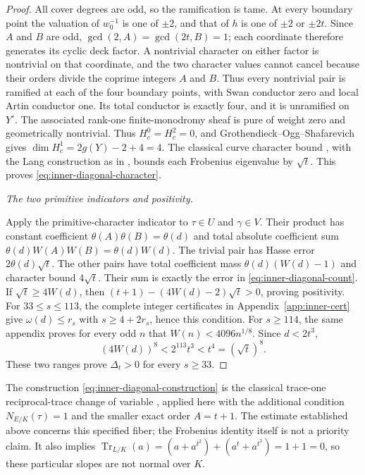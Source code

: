\documentclass[11pt]{article}
\begin{document}
\begin{proof}
All cover degrees are odd, so the ramification is tame.
At every boundary point the valuation of $w_0^{-1}$ is one of
$\pm2$, and that of $h$ is one of $\pm2$ or $\pm2t$.
Since $A$ and $B$ are odd, $\gcd(2,A)=\gcd(2t,B)=1$; each
coordinate therefore generates its cyclic deck factor. A nontrivial
character on either factor is nontrivial on that coordinate, and the
two character values cannot cancel because their orders divide the
coprime integers $A$ and $B$. Thus every nontrivial pair is ramified
at each of the four boundary points, with Swan conductor zero and
local Artin conductor one.
Its total conductor is exactly four, and it is unramified on
$Y^\circ$.
The associated rank-one finite-monodromy sheaf is pure of weight
zero and geometrically nontrivial. Thus $H_c^0=H_c^2=0$, and
Grothendieck--Ogg--Shafarevich gives
$\dim H_c^1=2g(Y)-2+4=4$.
The classical curve character bound
\cite[Lemma~1]{FFSTV13}, with the Lang construction as in
\cite{Katz89}, bounds each Frobenius eigenvalue by $\sqrt t$.
This proves \eqref{eq:inner-diagonal-character}.

\smallskip\noindent\textit{The two primitive indicators and positivity.}\par
Apply the primitive-character indicator to $\tau\in U$ and
$\gamma\in V$. Their product has constant coefficient
$\theta(A)\theta(B)=\theta(d)$ and total absolute coefficient
sum $\theta(d)W(A)W(B)=\theta(d)W(d)$.
The trivial pair has Hasse error $2\theta(d)\sqrt t$.
The other pairs have total coefficient mass
$\theta(d)(W(d)-1)$ and character bound $4\sqrt t$.
Their sum is exactly the error in \eqref{eq:inner-diagonal-count}.
If $\sqrt t\ge4W(d)$, then
$(t+1)-(4W(d)-2)\sqrt t>0$, proving positivity.
For $33\le s\le113$, the complete integer certificates in
Appendix~\ref{app:inner-cert} give
$\omega(d)\le r_s$ with $s\ge4+2r_s$, hence this condition.
For $s\ge114$, the same appendix proves for every odd $n$ that
$W(n)<4096n^{1/8}$. Since $d<2t^3$,
\[
 (4W(d))^8<2^{113}t^3<t^4=(\sqrt t)^8.
\]
These two ranges prove $\Delta_t>0$ for every $s\ge33$.
\end{proof}

The construction \eqref{eq:inner-diagonal-construction} is the
classical trace-one reciprocal-trace change of variable
\cite[\S4]{Coh}, applied here with the additional condition
$N_{E/K}(\tau)=1$ and the smaller exact order $A=t+1$.
The estimate established above concerns this specified fiber;
the Frobenius identity itself is not a priority claim.
It also implies
$\operatorname{Tr}_{L/K}(a)=(a+a^{t^2})+(a^t+a^{t^3})=1+1=0$,
so these particular slopes are not normal over $K$.
\end{document}
